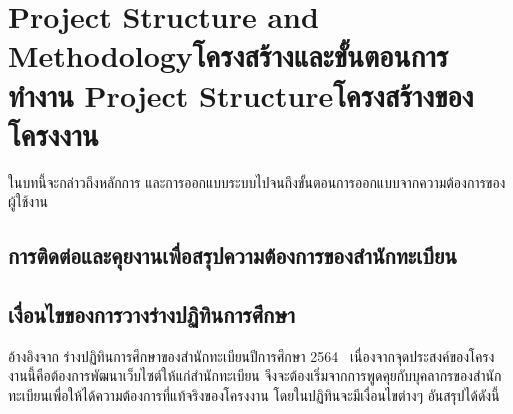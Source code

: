 \chapter{\ifproject%
\ifenglish Project Structure and Methodology\else โครงสร้างและขั้นตอนการทำงาน\fi
\else%
\ifenglish Project Structure\else โครงสร้างของโครงงาน\fi
\fi
}

ในบทนี้จะกล่าวถึงหลักการ และการออกแบบระบบไปจนถึงขั้นตอนการออกแบบจากความต้องการของผู้ใช้งาน

\makeatletter


\makeatother

\section{การติดต่อและคุยงานเพื่อสรุปความต้องการของสำนักทะเบียน}


\section{เงื่อนไขของการวางร่างปฏิทินการศึกษา}
  อ้างอิงจาก ร่างปฏิทินการศึกษาของสำนักทะเบียนปีการศึกษา 2564~\cite{CMU_Calendar}
  เนื่องจากจุดประสงค์ของโครงงานนี้คือต้องการพัฒนาเว็บไซต์ให้แก่สำนักทะเบียน
จึงจะต้องเริ่มจากการพูดคุยกับบุคลากรของสำนักทะเบียนเพื่อให้ได้ความต้องการที่แท้จริงของโครงงาน โดยในปฏิทินจะมีเงื่อนไขต่างๆ อันสรุปได้ดังนี้

